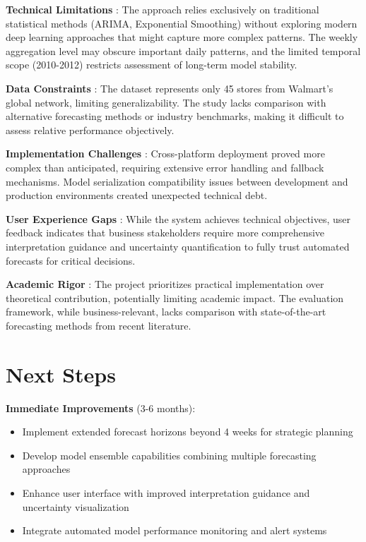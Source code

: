 \textbf{Technical Limitations }: The approach relies exclusively on traditional statistical methods (ARIMA, Exponential Smoothing) without exploring modern deep learning approaches that might capture more complex patterns. The weekly aggregation level may obscure important daily patterns, and the limited temporal scope (2010-2012) restricts assessment of long-term model stability.

\textbf{Data Constraints }: The dataset represents only 45 stores from Walmart's global network, limiting generalizability. The study lacks comparison with alternative forecasting methods or industry benchmarks, making it difficult to assess relative performance objectively.

\textbf{Implementation Challenges }: Cross-platform deployment proved more complex than anticipated, requiring extensive error handling and fallback mechanisms. Model serialization compatibility issues between development and production environments created unexpected technical debt.

\textbf{User Experience Gaps }: While the system achieves technical objectives, user feedback indicates that business stakeholders require more comprehensive interpretation guidance and uncertainty quantification to fully trust automated forecasts for critical decisions.

\textbf{Academic Rigor }: The project prioritizes practical implementation over theoretical contribution, potentially limiting academic impact. The evaluation framework, while business-relevant, lacks comparison with state-of-the-art forecasting methods from recent literature.

\section{Next Steps}

\textbf{Immediate Improvements } (3-6 months):
\begin{itemize}
	\item Implement extended forecast horizons beyond 4 weeks for strategic planning
	\item Develop model ensemble capabilities combining multiple forecasting approaches
	\item Enhance user interface with improved interpretation guidance and uncertainty visualization
	\item Integrate automated model performance monitoring and alert systems
\end{itemize}


